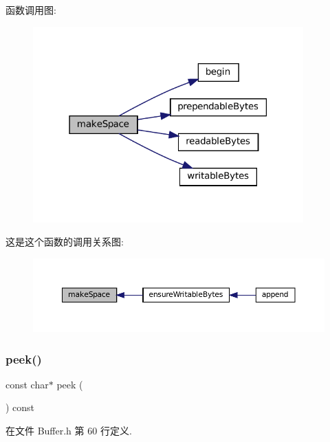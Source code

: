 函数调用图\+:
\nopagebreak
\begin{figure}[H]
\begin{center}
\leavevmode
\includegraphics[width=295pt]{classmuduo_1_1Buffer_a83d5a5ce302569b35df7743314578791_cgraph}
\end{center}
\end{figure}
这是这个函数的调用关系图\+:
\nopagebreak
\begin{figure}[H]
\begin{center}
\leavevmode
\includegraphics[width=350pt]{classmuduo_1_1Buffer_a83d5a5ce302569b35df7743314578791_icgraph}
\end{center}
\end{figure}
\mbox{\label{classmuduo_1_1Buffer_ad1339d8b1a42e9762ae6cd3add003706}} 
\subsubsection{\texorpdfstring{peek()}{peek()}}
{\footnotesize\ttfamily const char$\ast$ peek (\begin{DoxyParamCaption}{ }\end{DoxyParamCaption}) const\hspace{0.3cm}{\ttfamily [inline]}}



在文件 Buffer.\+h 第 60 行定义.



